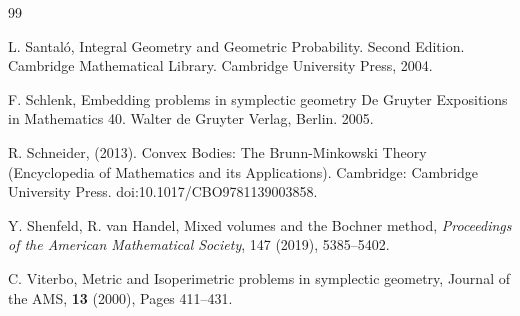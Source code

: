 \documentclass[12pt]{amsart}
\theoremstyle{definition}
\begin{document}
\begin{thebibliography} {99}



 L. Santal\'o, Integral Geometry and Geometric Probability. Second Edition. Cambridge Mathematical Library. Cambridge University Press, 2004.

 F. Schlenk, Embedding problems in symplectic geometry
De Gruyter Expositions in Mathematics 40. Walter de Gruyter Verlag, Berlin. 2005.

 R. Schneider,  (2013). Convex Bodies: The Brunn-Minkowski Theory (Encyclopedia of Mathematics and its Applications). Cambridge: Cambridge University Press. doi:10.1017/CBO9781139003858.



 Y. Shenfeld, R. van Handel, Mixed volumes and the Bochner method, {\em Proceedings of the American Mathematical Society}, 147 (2019), 5385--5402.









 C. Viterbo, Metric and Isoperimetric problems in symplectic geometry, Journal of the AMS, \textbf{13} (2000), Pages 411--431.



\end{thebibliography}
\end{document}
